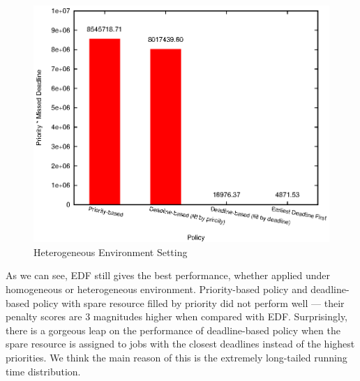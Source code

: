 \begin{figure}[htbp]
  \centering
  \includegraphics[width=\textwidth,height=0.7\textheight,keepaspectratio]{figures/hetero.eps}
  \caption{Heterogeneous Environment Setting}
  \label{fig:hetero-exp}
\end{figure}

As we can see, EDF still gives the best performance, whether applied
under homogeneous or heterogeneous environment.
Priority-based policy and deadline-based policy with spare resource
filled by priority did not perform well --- their penalty scores are 3
magnitudes higher when compared with EDF.
Surprisingly, there is a gorgeous leap on the performance of
deadline-based policy when the spare resource is assigned to jobs with
the closest deadlines instead of the highest priorities.
We think the main reason of this is the extremely long-tailed running
time distribution.
